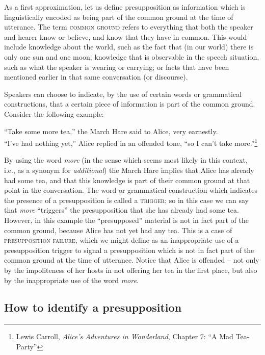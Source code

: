 As a first approximation, let us define presupposition as information which is linguistically encoded as being part of the common ground at the time of utterance. The term \textsc{common ground} refers to everything that both the speaker and hearer know or believe, and know that they have in common. This would include knowledge about the world, such as the fact that (in our world) there is only one sun and one moon; knowledge that is observable in the speech situation, such as what the speaker is wearing or carrying; or facts that have been mentioned earlier in that same conversation (or discourse).



Speakers can choose to indicate, by the use of certain words or grammatical constructions, that a certain piece of information is part of the common ground. Consider the following example:


\ea \label{ex:3.10}
“Take some more tea,” the March Hare said to Alice, very earnestly.\\
“I’ve had nothing yet,” Alice replied in an offended tone, “so I can’t take more.”\footnote{Lewis Carroll, \textit{Alice’s Adventures in Wonderland}, Chapter 7: “A Mad Tea-Party”}
\z


By using the word \textit{more} (in the sense which seems most likely in this context, i.e., as a synonym for \textit{additional}) the March Hare implies that Alice has already had some tea, and that this knowledge is part of their common ground at that point in the conversation. The word or grammatical construction which indicates the presence of a presupposition is called a \textsc{trigger}; so in this case we can say that \textit{more} “triggers” the presupposition that she has already had some tea. However, in this example the “presupposed” material is not in fact part of the common ground, because Alice has not yet had any tea. This is a case of \textsc{presupposition failure}, which we might define as an inappropriate use of a presupposition trigger to signal a presupposition which is not in fact part of the common ground at the time of utterance. Notice that Alice is offended – not only by the impoliteness of her hosts in not offering her tea in the first place, but also by the inappropriate use of the word \textit{more}.


\subsection{How to identify a presupposition}\label{sec:3.4.1}
\largerpage[2]

